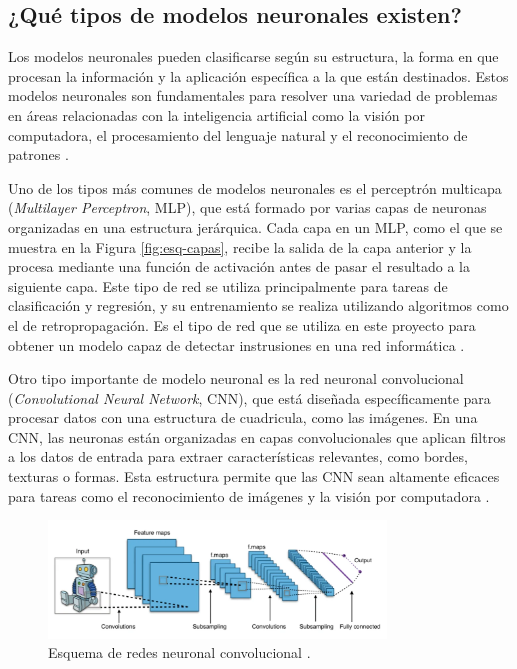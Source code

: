 \subsection{¿Qué tipos de modelos neuronales existen?}\label{subsec.tiposmodel}

Los modelos neuronales pueden clasificarse según su estructura, la forma en que procesan la información y la aplicación específica a la que están destinados. Estos modelos neuronales son fundamentales para resolver una variedad de problemas en áreas relacionadas con la inteligencia artificial como la visión por computadora, el procesamiento del lenguaje natural y el reconocimiento de patrones \cite{bishop2006pattern}.

Uno de los tipos más comunes de modelos neuronales es el perceptrón multicapa (\textit{Multilayer Perceptron}, MLP), que está formado por varias capas de neuronas organizadas en una estructura jerárquica. Cada capa en un MLP, como el que se muestra en la Figura \ref{fig:esq-capas}, recibe la salida de la capa anterior y la procesa mediante una función de activación antes de pasar el resultado a la siguiente capa. Este tipo de red se utiliza principalmente para tareas de clasificación y regresión, y su entrenamiento se realiza utilizando algoritmos como el de retropropagación. Es el tipo de red que se utiliza en este proyecto para obtener un modelo capaz de detectar instrusiones en una red informática \cite{goodfellow2016deep}.

Otro tipo importante de modelo neuronal es la red neuronal convolucional (\textit{Convolutional Neural Network}, CNN), que está diseñada específicamente para procesar datos con una estructura de cuadricula, como las imágenes. En una CNN, las neuronas están organizadas en capas convolucionales que aplican filtros a los datos de entrada para extraer características relevantes, como bordes, texturas o formas. Esta estructura permite que las CNN sean altamente eficaces para tareas como el reconocimiento de imágenes y la visión por computadora \cite{goodfellow2016deep}.


\begin{figure}[H]
    \centering
    \includegraphics[width=0.8\textwidth]{./img/modelo/CNN.png}
    \caption{Esquema de redes neuronal convolucional \cite{uniteai2020cnn}.}
    \label{fig:esq-CNN}
\end{figure}


